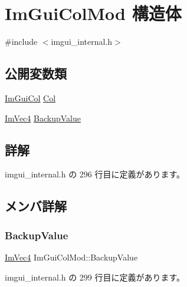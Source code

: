 \hypertarget{struct_im_gui_col_mod}{}\section{Im\+Gui\+Col\+Mod 構造体}
\label{struct_im_gui_col_mod}


{\ttfamily \#include $<$imgui\+\_\+internal.\+h$>$}

\subsection*{公開変数類}
\begin{DoxyCompactItemize}
\item 
\mbox{\hyperlink{imgui_8h_a1b0467ec582e731ae6292fef726fb5fe}{Im\+Gui\+Col}} \mbox{\hyperlink{struct_im_gui_col_mod_aaa66ad29c378b8800098ab4d4e1c91a6}{Col}}
\item 
\mbox{\hyperlink{struct_im_vec4}{Im\+Vec4}} \mbox{\hyperlink{struct_im_gui_col_mod_a7c23f178bbf5cbdb1333332bb84f73c9}{Backup\+Value}}
\end{DoxyCompactItemize}


\subsection{詳解}


 imgui\+\_\+internal.\+h の 296 行目に定義があります。



\subsection{メンバ詳解}
\mbox{\label{struct_im_gui_col_mod_a7c23f178bbf5cbdb1333332bb84f73c9}} 
\subsubsection{\texorpdfstring{Backup\+Value}{BackupValue}}
{\footnotesize\ttfamily \mbox{\hyperlink{struct_im_vec4}{Im\+Vec4}} Im\+Gui\+Col\+Mod\+::\+Backup\+Value}



 imgui\+\_\+internal.\+h の 299 行目に定義があります。

\mbox{\label{struct_im_gui_col_mod_aaa66ad29c378b8800098ab4d4e1c91a6}} 
